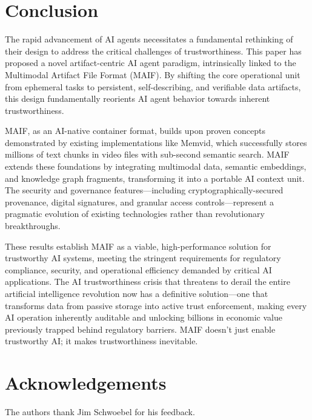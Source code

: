 \documentclass[conference]{IEEEtran}
\begin{document}
\section{Conclusion}

The rapid advancement of AI agents necessitates a fundamental rethinking of their design to address the critical challenges of trustworthiness. This paper has proposed a novel artifact-centric AI agent paradigm, intrinsically linked to the Multimodal Artifact File Format (MAIF). By shifting the core operational unit from ephemeral tasks to persistent, self-describing, and verifiable data artifacts, this design fundamentally reorients AI agent behavior towards inherent trustworthiness.

MAIF, as an AI-native container format, builds upon proven concepts demonstrated by existing implementations like Memvid, which successfully stores millions of text chunks in video files with sub-second semantic search. MAIF extends these foundations by integrating multimodal data, semantic embeddings, and knowledge graph fragments, transforming it into a portable AI context unit. The security and governance features—including cryptographically-secured provenance, digital signatures, and granular access controls—represent a pragmatic evolution of existing technologies rather than revolutionary breakthroughs.


These results establish MAIF as a viable, high-performance solution for trustworthy AI systems, meeting the stringent requirements for regulatory compliance, security, and operational efficiency demanded by critical AI applications. The AI trustworthiness crisis that threatens to derail the entire artificial intelligence revolution now has a definitive solution—one that transforms data from passive storage into active trust enforcement, making every AI operation inherently auditable and unlocking billions in economic value previously trapped behind regulatory barriers. MAIF doesn't just enable trustworthy AI; it makes trustworthiness inevitable.

\section{Acknowledgements}
The authors thank Jim Schwoebel for his feedback.


\appendices
\end{document}

